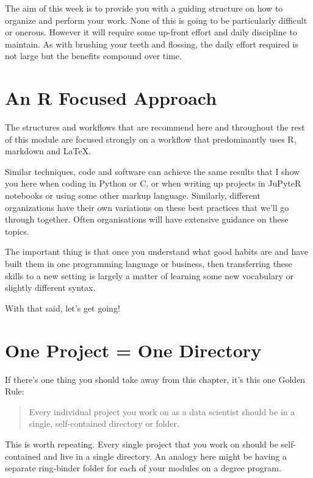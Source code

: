 \documentclass[
  letterpaper,
  DIV=11,
  numbers=noendperiod]{scrreprt}
\begin{document}
The aim of this week is to provide you with a guiding structure on how
to organize and perform your work. None of this is going to be
particularly difficult or onerous. However it will require some up-front
effort and daily discipline to maintain. As with brushing your teeth and
flossing, the daily effort required is not large but the benefits
compound over time.

\section{An R Focused Approach}\label{an-r-focused-approach}

The structures and workflows that are recommend here and throughout the
rest of this module are focused strongly on a workflow that
predominantly uses R, markdown and LaTeX.

Similar techniques, code and software can achieve the same results that
I show you here when coding in Python or C, or when writing up projects
in JuPyteR notebooks or using some other markup language. Similarly,
different organizations have their own variations on these best
practices that we'll go through together. Often organisations will have
extensive guidance on these topics.

The important thing is that once you understand what good habits are and
have built them in one programming language or business, then
transferring these skills to a new setting is largely a matter of
learning some new vocabulary or slightly different syntax.

With that said, let's get going!

\section{One Project = One Directory}\label{one-project-one-directory}

If there's one thing you should take away from this chapter, it's this
one Golden Rule:

\begin{quote}
Every individual project you work on as a data scientist should be in a
single, self-contained directory or folder.
\end{quote}

This is worth repeating. Every single project that you work on should be
self-contained and live in a single directory. An analogy here might be
having a separate ring-binder folder for each of your modules on a
degree program.
\end{document}
